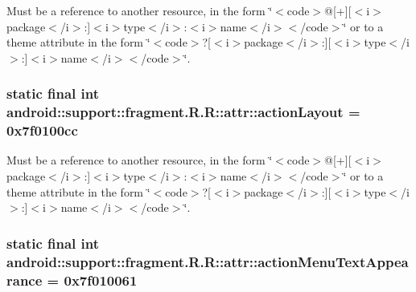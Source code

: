 Must be a reference to another resource, in the form \char`\"{}$<$code$>$@\mbox{[}+\mbox{]}\mbox{[}$<$i$>$package$<$/i$>$:\mbox{]}$<$i$>$type$<$/i$>$:$<$i$>$name$<$/i$>$$<$/code$>$\char`\"{} or to a theme attribute in the form \char`\"{}$<$code$>$?\mbox{[}$<$i$>$package$<$/i$>$:\mbox{]}\mbox{[}$<$i$>$type$<$/i$>$:\mbox{]}$<$i$>$name$<$/i$>$$<$/code$>$\char`\"{}. \hypertarget{classandroid_1_1support_1_1fragment_1_1_r_1_1attr_7e189afae5655e4ac5157f02f08ffa96}{
\subsubsection[{actionLayout}]{\setlength{\rightskip}{0pt plus 5cm}static final int android::support::fragment.R.R::attr::actionLayout = 0x7f0100cc}}
\label{classandroid_1_1support_1_1fragment_1_1_r_1_1attr_7e189afae5655e4ac5157f02f08ffa96}


Must be a reference to another resource, in the form \char`\"{}$<$code$>$@\mbox{[}+\mbox{]}\mbox{[}$<$i$>$package$<$/i$>$:\mbox{]}$<$i$>$type$<$/i$>$:$<$i$>$name$<$/i$>$$<$/code$>$\char`\"{} or to a theme attribute in the form \char`\"{}$<$code$>$?\mbox{[}$<$i$>$package$<$/i$>$:\mbox{]}\mbox{[}$<$i$>$type$<$/i$>$:\mbox{]}$<$i$>$name$<$/i$>$$<$/code$>$\char`\"{}. \hypertarget{classandroid_1_1support_1_1fragment_1_1_r_1_1attr_fb4c9cbb60189a31e7cefdf0ce032a6c}{
\subsubsection[{actionMenuTextAppearance}]{\setlength{\rightskip}{0pt plus 5cm}static final int android::support::fragment.R.R::attr::actionMenuTextAppearance = 0x7f010061}}
\label{classandroid_1_1support_1_1fragment_1_1_r_1_1attr_fb4c9cbb60189a31e7cefdf0ce032a6c}


